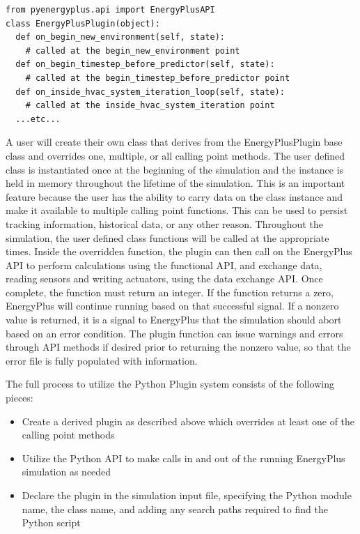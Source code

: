 \documentclass[5p, authoryear]{elsarticle}
\begin{document}
\lstset{language=python}
\begin{lstlisting}
from pyenergyplus.api import EnergyPlusAPI
class EnergyPlusPlugin(object):
  def on_begin_new_environment(self, state):
    # called at the begin_new_environment point
  def on_begin_timestep_before_predictor(self, state):
    # called at the begin_timestep_before_predictor point
  def on_inside_hvac_system_iteration_loop(self, state):
    # called at the inside_hvac_system_iteration point
  ...etc...
\end{lstlisting}

A user will create their own class that derives from the EnergyPlusPlugin base class and overrides one, multiple, or all calling point methods.  The user defined class is instantiated once at the beginning of the simulation and the instance is held in memory throughout the lifetime of the simulation.  This is an important feature because the user has the ability to carry data on the class instance and make it available to multiple calling point functions.  This can be used to persist tracking information, historical data, or any other reason.  Throughout the simulation, the user defined class functions will be called at the appropriate times.  Inside the overridden function, the plugin can then call on the EnergyPlus API to perform calculations using the functional API, and exchange data, reading sensors and writing actuators, using the data exchange API.  Once complete, the function must return an integer.  If the function returns a zero, EnergyPlus will continue running based on that successful signal.  If a nonzero value is returned, it is a signal to EnergyPlus that the simulation should abort based on an error condition.  The plugin function can issue warnings and errors through API methods if desired prior to returning the nonzero value, so that the error file is fully populated with information.

The full process to utilize the Python Plugin system consists of the following pieces:
\begin{itemize}
 \item Create a derived plugin as described above which overrides at least one of the calling point methods
 \item Utilize the Python API to make calls in and out of the running EnergyPlus simulation as needed
 \item Declare the plugin in the simulation input file, specifying the Python module name, the class name, and adding any search paths required to find the Python script
\end{itemize}
\end{document}
